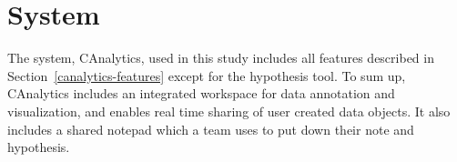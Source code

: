 \section{System}

The system, CAnalytics, used in this study includes all features described in Section~\ref{canalytics-features} except for the hypothesis tool. To sum up, CAnalytics includes an integrated workspace for data annotation and visualization, and enables real time sharing of user created data objects. It also includes a shared notepad which a team uses to put down their note and hypothesis. 